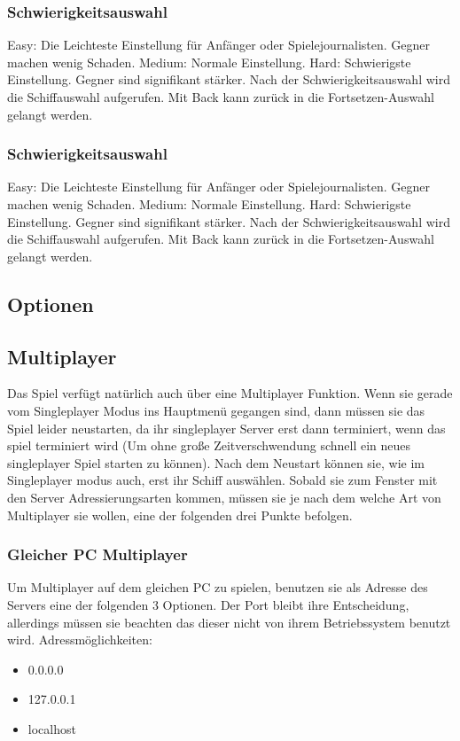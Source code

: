 \documentclass[fontsize=12pt,paper=a4,twoside]{scrartcl}
\begin{document}
\subsubsection{Schwierigkeitsauswahl}
Easy: Die Leichteste Einstellung für Anfänger oder Spielejournalisten. Gegner machen wenig Schaden.
Medium: Normale Einstellung. 
Hard: Schwierigste Einstellung. Gegner sind signifikant stärker.
Nach der Schwierigkeitsauswahl wird die Schiffauswahl aufgerufen.
Mit Back kann zurück in die Fortsetzen-Auswahl gelangt werden. 
\subsubsection{Schwierigkeitsauswahl}
Easy: Die Leichteste Einstellung für Anfänger oder Spielejournalisten. Gegner machen wenig Schaden.
Medium: Normale Einstellung. 
Hard: Schwierigste Einstellung. Gegner sind signifikant stärker.
Nach der Schwierigkeitsauswahl wird die Schiffauswahl aufgerufen.
Mit Back kann zurück in die Fortsetzen-Auswahl gelangt werden. 
\subsection{Optionen}


\subsection{Multiplayer}

Das Spiel verfügt natürlich auch über eine Multiplayer Funktion. Wenn sie gerade vom Singleplayer Modus ins Hauptmenü gegangen sind, dann müssen sie das Spiel leider neustarten, da ihr singleplayer Server erst dann terminiert, wenn das spiel terminiert wird (Um ohne große Zeitverschwendung schnell ein neues singleplayer Spiel starten zu können). Nach dem Neustart können sie, wie im Singleplayer modus auch, erst ihr Schiff auswählen. Sobald sie zum Fenster mit den Server Adressierungsarten kommen, müssen sie je nach dem welche Art von Multiplayer sie wollen, eine der folgenden drei Punkte befolgen.

\subsubsection{Gleicher PC Multiplayer}
Um Multiplayer auf dem gleichen PC zu spielen, benutzen sie als Adresse des Servers eine der folgenden 3 Optionen. Der Port bleibt ihre Entscheidung, allerdings müssen sie beachten das dieser nicht von ihrem Betriebssystem benutzt wird. 
Adressmöglichkeiten:
\begin{itemize}
\item 0.0.0.0
\item 127.0.0.1
\item localhost
\end{itemize}
\end{document}
